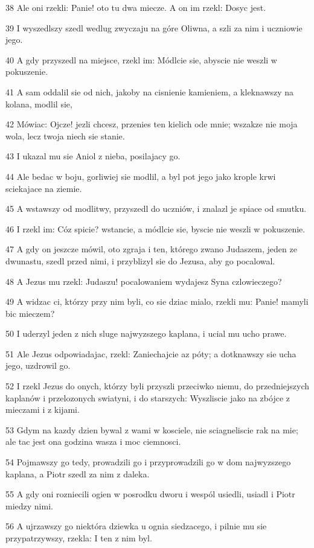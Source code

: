 \par 38 Ale oni rzekli: Panie! oto tu dwa miecze. A on im rzekl: Dosyc jest.
\par 39 I wyszedlszy szedl wedlug zwyczaju na góre Oliwna, a szli za nim i uczniowie jego.
\par 40 A gdy przyszedl na miejsce, rzekl im: Módlcie sie, abyscie nie weszli w pokuszenie.
\par 41 A sam oddalil sie od nich, jakoby na cisnienie kamieniem, a kleknawszy na kolana, modlil sie,
\par 42 Mówiac: Ojcze! jezli chcesz, przenies ten kielich ode mnie; wszakze nie moja wola, lecz twoja niech sie stanie.
\par 43 I ukazal mu sie Aniol z nieba, posilajacy go.
\par 44 Ale bedac w boju, gorliwiej sie modlil, a byl pot jego jako krople krwi sciekajace na ziemie.
\par 45 A wstawszy od modlitwy, przyszedl do uczniów, i znalazl je spiace od smutku.
\par 46 I rzekl im: Cóz spicie? wstancie, a módlcie sie, byscie nie weszli w pokuszenie.
\par 47 A gdy on jeszcze mówil, oto zgraja i ten, którego zwano Judaszem, jeden ze dwunastu, szedl przed nimi, i przyblizyl sie do Jezusa, aby go pocalowal.
\par 48 A Jezus mu rzekl: Judaszu! pocalowaniem wydajesz Syna czlowieczego?
\par 49 A widzac ci, którzy przy nim byli, co sie dziac mialo, rzekli mu: Panie! mamyli bic mieczem?
\par 50 I uderzyl jeden z nich sluge najwyzszego kaplana, i ucial mu ucho prawe.
\par 51 Ale Jezus odpowiadajac, rzekl: Zaniechajcie az póty; a dotknawszy sie ucha jego, uzdrowil go.
\par 52 I rzekl Jezus do onych, którzy byli przyszli przeciwko niemu, do przedniejszych kaplanów i przelozonych swiatyni, i do starszych: Wyszliscie jako na zbójce z mieczami i z kijami.
\par 53 Gdym na kazdy dzien bywal z wami w kosciele, nie sciagneliscie rak na mie; ale tac jest ona godzina wasza i moc ciemnosci.
\par 54 Pojmawszy go tedy, prowadzili go i przyprowadzili go w dom najwyzszego kaplana, a Piotr szedl za nim z daleka.
\par 55 A gdy oni rozniecili ogien w posrodku dworu i wespól usiedli, usiadl i Piotr miedzy nimi.
\par 56 A ujrzawszy go niektóra dziewka u ognia siedzacego, i pilnie mu sie przypatrzywszy, rzekla: I ten z nim byl.
